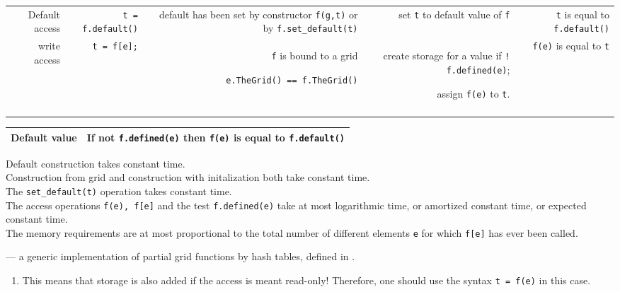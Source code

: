 \begin{tabularx}{15cm}{RRRRR}
    Default access &
    {\tt t = f.default()} &
    default has been set by constructor {\tt f(g,t)} 
    or by  {\tt f.set\_default(t)} &
    set {\tt t} to  default value of {\tt f} &
    {\tt t} is equal to {\tt f.default()} 
   \\
    write access &
    {\tt t = f[e];} &
    {\tt f} is bound to a grid
    \par {\tt e.TheGrid() == f.TheGrid()} &
    create storage for a value
    if  {\tt ! f.defined(e)};
    \par assign  {\tt f(e)} to  {\tt t}. &
    {\tt f(e)} is equal to {\tt t}
   \\
   \hline
   \\
 \end{tabularx}

 \begin{tabular}{ll} 
   \hline
   Default value &
   If not  {\tt f.defined(e)} then  {\tt f(e)} is equal to {\tt f.default()}  
   \\ 
   \hline
 \end{tabular}

 Default construction takes constant time.
 \\
 Construction from grid and construction with initalization both
 take constant time.
 \\
 The {\tt set\_default(t)} operation takes constant time.
 \\
 The access operations {\tt f(e), f[e]} and the test  {\tt f.defined(e)}
 take at most logarithmic time, or amortized constant time, or expected constant time.
 \\
 The memory requirements are at most proportional to the total number of different
 elements {\tt e} for which {\tt f[e]} has ever been called.
 
 --- a generic implementation of partial grid functions by hash tables,
 defined in
 .


 \begin{enumerate}
 \item {}
   This means that storage is also added if the access is meant read-only!
   Therefore, one should use the syntax {\tt t = f(e)} in this case.
 \end{enumerate}
 
  ~
  ~
  ~
  ~
  ~
  

